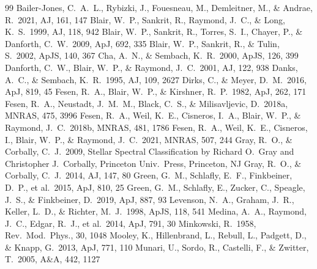 \documentclass[fleqn,usenatbib]{mnras}
\begin{document}
\begin{thebibliography}{99}
 Bailer-Jones, C.~A.~L., Rybizki, J., Fouesneau, M., Demleitner, M., \& Andrae, R.\ 2021, AJ, 161, 147
 Blair, W.~P., Sankrit, R., Raymond, J.~C., \& Long, K.~S.\ 1999, AJ, 118, 942
 Blair, W.~P., Sankrit, R., Torres, S.~I., Chayer, P., \& Danforth, C.~W.\ 2009, ApJ, 692, 335
 Blair, W.~P., Sankrit, R., \& Tulin, S.\ 2002, ApJS, 140, 367
 Cha, A.~N., \& Sembach, K.~R.\ 2000, ApJS, 126, 399
 Danforth, C.~W., Blair, W.~P., \& Raymond, J.~C.\ 2001, AJ, 122, 938
 Danks, A.~C., \& Sembach, K.~R.\ 1995, AJ, 109, 2627
 Dirks, C., \& Meyer, D.~M.\ 2016, ApJ, 819, 45
 Fesen, R.~A., Blair, W.~P., \& Kirshner, R.~P.\ 1982, ApJ, 262, 171
 Fesen, R.~A., Neustadt, J.~M.~M., Black, C.~S., \& Milisavljevic, D.\ 2018a, MNRAS, 475, 3996
 Fesen, R.~A., Weil, K.~E., Cisneros, I.~A., Blair, W.~P., \& Raymond, J.~C.\ 2018b, MNRAS, 481, 1786
 Fesen, R.~A., Weil, K.~E., Cisneros, I., Blair, W.~P., \& Raymond, J.~C.\ 2021, MNRAS, 507, 244
 Gray, R.~O., \& Corbally, C.~J.\ 2009, Stellar Spectral Classification by Richard O.~Gray and Christopher J.~Corbally, Princeton Univ.~Press, Princeton, NJ
 Gray, R.~O., \& Corbally, C.~J.\ 2014, AJ, 147, 80
 Green, G.~M., Schlafly, E.~F., Finkbeiner, D.~P., et al.\ 2015, ApJ, 810, 25
 Green, G.~M., Schlafly, E., Zucker, C., Speagle, J.~S., \& Finkbeiner, D.\ 2019, ApJ, 887, 93
 Levenson, N.~A., Graham, J.~R., Keller, L.~D., \& Richter, M.~J.\ 1998, ApJS, 118, 541
 Medina, A.~A., Raymond, J.~C., Edgar, R.~J., et al.\ 2014, ApJ, 791, 30
 Minkowski, R.\ 1958, Rev.~Mod.~Phys., 30, 1048
 Mooley, K., Hillenbrand, L., Rebull, L., Padgett, D., \& Knapp, G.\ 2013, ApJ, 771, 110
 Munari, U., Sordo, R., Castelli, F., \& Zwitter, T.\ 2005, A\&A, 442, 1127

\end{thebibliography}
\end{document}
